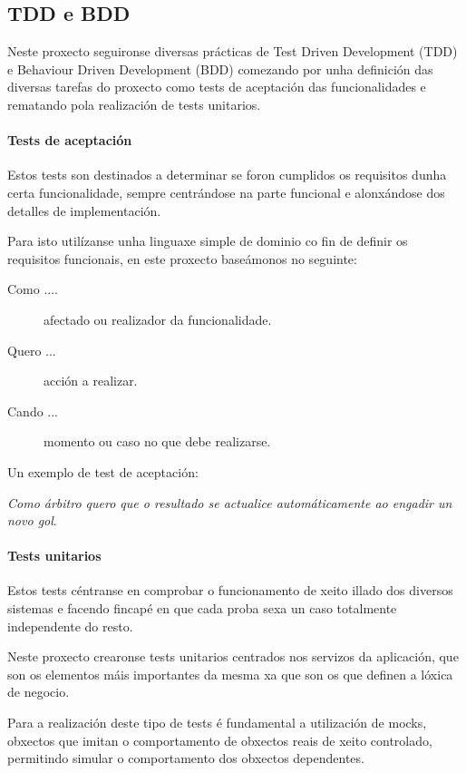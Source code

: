     \subsection{TDD e BDD}
  Neste proxecto seguironse diversas prácticas de Test Driven Development 
(TDD)\cite{book:cleancode} e Behaviour Driven Development 
(BDD)\cite{book:cucumber} comezando por unha definición das 
diversas tarefas do proxecto como tests de aceptación das funcionalidades e 
rematando pola realización de tests unitarios.

      \paragraph{Tests de aceptación} Estos tests son destinados a determinar 
se foron cumplidos os requisitos dunha certa funcionalidade, sempre 
centrándose na parte funcional e alonxándose dos detalles de implementación.

      Para isto utilízanse unha linguaxe simple de dominio co fin de definir os 
requisitos funcionais, en este proxecto baseámonos no seguinte:

        \begin{description}
         \item [Como ....] afectado ou realizador da funcionalidade.
         \item [Quero ...] acción a realizar.
         \item [Cando ...] momento ou caso no que debe realizarse.
        \end{description}

        Un exemplo de test de aceptación:

        \emph{Como árbitro quero que o resultado se actualice automáticamente 
ao engadir un novo gol}.

      \paragraph{Tests unitarios} Estos tests céntranse en comprobar o 
funcionamento de xeito illado dos diversos sistemas e facendo fincapé en que 
cada proba sexa un caso totalmente independente do resto.

      Neste proxecto crearonse tests unitarios centrados nos servizos da 
aplicación, que son os elementos máis importantes da mesma xa que son os que 
definen a lóxica de negocio.

      Para a realización deste tipo de tests é fundamental a utilización de 
mocks, obxectos que imitan o comportamento de obxectos reais de xeito 
controlado, permitindo simular o comportamento dos obxectos dependentes.

